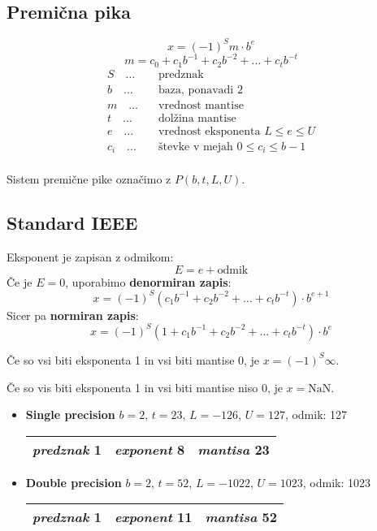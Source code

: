 
 

\begin{multicols}{5}
\setlength{\premulticols}{1pt}
\setlength{\postmulticols}{1pt}
\setlength{\multicolsep}{1pt}
\setlength{\columnsep}{2pt}

\section{Premična pika}
\[ x = (-1)^S m \cdot b^e\]
\[ m = c_0 + c_1 b^{-1} + c_2 b^{-2} + \dots + c_t b^{-t} \]
\begin{align*}
	S\quad \dots \quad & \text{predznak} \\
	b\quad \dots \quad & \text{baza, ponavadi 2} \\
	m\quad \dots \quad & \text{vrednost mantise} \\
	t\quad \dots \quad & \text{dolžina mantise} \\
	e\quad \dots \quad & \text{vrednost eksponenta $L \leq e \leq U$} \\
	c_i\quad \dots \quad & \text{števke v mejah $0 \leq c_i \leq b-1$} \\
\end{align*}

Sistem premične pike označimo z $P(b, t, L, U)$.

\subsection{Standard IEEE}
Eksponent je zapisan z odmikom:
\[ E = e + \text{odmik}\]
Če je $E=0$, uporabimo \textbf{denormiran zapis}:
\[ x = (-1)^S (c_1 b^{-1} + c_2 b^{-2} + \dots + c_t b^{-t}) \cdot b^{e+1}\]
Sicer pa \textbf{normiran zapis}:
\[ x = (-1)^S (1 + c_1 b^{-1} + c_2 b^{-2} + \dots + c_t b^{-t}) \cdot b^{e}\]

Če so vsi biti eksponenta 1 in vsi biti mantise 0, je $x = (-1)^S \infty$.

Če so vis biti eksponenta 1 in vsi biti mantise niso 0, je $x = \text{NaN}$.

\begin{itemize}
	\item \textbf{Single precision} $b=2$, $t=23$, $L=-126$, $U=127$,
	odmik: 127
	\begin{center}
		\begin{tabular}{ |c|c|c| } 
			\hline
			\textit{predznak} 1 & \textit{exponent} 8 & \textit{mantisa} 23 \\ 
			\hline
		\end{tabular}
	\end{center}
	\item \textbf{Double precision} $b=2$, $t=52$, $L=-1022$, $U=1023$, 
	odmik: 1023
	\begin{center}
		\begin{tabular}{ |c|c|c| } 
		 \hline
		 \textit{predznak} 1 & \textit{exponent} 11 & \textit{mantisa} 52 \\ 
		 \hline
		\end{tabular}
	\end{center}
\end{itemize}


\end{multicols}
